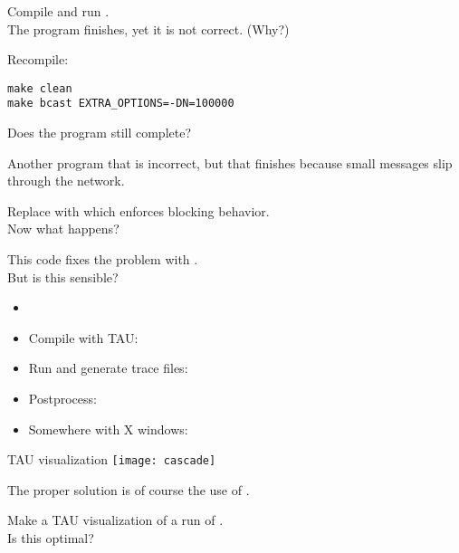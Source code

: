 \documentclass[11pt,headernav]{beamer}
\begin{document}
\begin{exerciseframe}[bcast]
  Compile and run .\\
  The program finishes, yet it is not correct. (Why?)

  Recompile:
\begin{verbatim}
make clean
make bcast EXTRA_OPTIONS=-DN=100000
\end{verbatim}
  Does the program still complete?
\end{exerciseframe}

\begin{exerciseframe}[sendrecv1]
  Another program that is incorrect, but that
  finishes because small messages slip through the network.

  Replace  with  which enforces blocking behavior.\\
  Now what happens?
\end{exerciseframe}

\begin{exerciseframe}[sendrecv2]
  This code fixes the problem with .\\
  But is this sensible?

  \begin{itemize}
  \item {}
  \item Compile with TAU:\\
  \item Run and generate trace files:\\
  \item Postprocess:\\
  \item Somewhere with X windows:\\
  \end{itemize}
\end{exerciseframe}

\begin{frame}{TAU visualization}
  \texttt{[image: cascade]}
\end{frame}

\begin{exerciseframe}[isendrecv]
  The proper solution is of course the use of .

  Make a TAU visualization of a run of .\\
  Is this optimal?
\end{exerciseframe}
\end{document}
